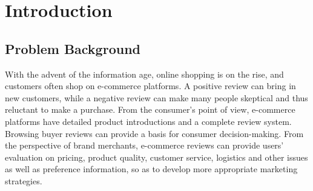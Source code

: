 \documentclass[12pt]{mcmthesis}
\begin{document}
\begin{abstract}
\textbf{Fourthly}, we establish 4 evaluation criteria to distinguish machine reviews and customer reviews, and design an algorithm model to calculate the score by combining \textbf{syntax tree and entropy weight method}. It is concluded that the score of customer reviews is generally higher than that of machine reviews, which strongly verifies our criteria.

\textbf{Finally}, we conducted a sensitivity analysis of the improved Naive Bayes model and concluded that the confusion of \textbf{7.52\%} of the data in the training set only caused a \textbf{3.21\%} increase in the deviation of the prediction results, so our model has excellent stability. 

\begin{keywords}
\textbf{shopping review ; the LDA-K-TF-IDF model ; Naive Bayes   ; Monte Carlo}
\end{keywords}
\end{abstract}
\maketitle
\setcounter{page}{2}
\tableofcontents
\newpage

\section{Introduction}
\subsection{Problem Background}
With the advent of the information age, online shopping is on the rise, and customers often shop on e-commerce platforms. A positive review can bring in new customers, while a negative review can make many people skeptical and thus reluctant to make a purchase. From the consumer's point of view, e-commerce platforms have detailed product introductions and a complete review system. Browsing buyer reviews can provide a basis for consumer decision-making. From the perspective of brand merchants, e-commerce reviews can provide users' evaluation on pricing, product quality, customer service, logistics and other issues as well as preference information, so as to develop more appropriate marketing strategies.
\end{document}

